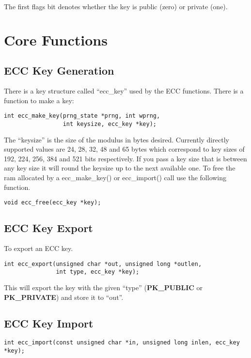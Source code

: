 \documentclass[a4paper]{book}
\begin{document}
The first flags bit denotes whether the key is public (zero) or private (one).  

\section{Core Functions}

\subsection{ECC Key Generation}
There is a key structure called ``ecc\_key'' used by the ECC functions.  There is a function to make a key:
\begin{verbatim}
int ecc_make_key(prng_state *prng, int wprng, 
                 int keysize, ecc_key *key);
\end{verbatim}

The ``keysize'' is the size of the modulus in bytes desired.  Currently directly supported values are 24, 28, 32, 48 and 65 bytes which
correspond to key sizes of 192, 224, 256, 384 and 521 bits respectively.  If you pass a key size that is between any key size it will round 
the keysize up to the next available one.   To free the ram allocated by a ecc\_make\_key() or ecc\_import() call use the following function.

\begin{verbatim}
void ecc_free(ecc_key *key);
\end{verbatim}

\subsection{ECC Key Export}
To export an ECC key.
\begin{verbatim}
int ecc_export(unsigned char *out, unsigned long *outlen, 
               int type, ecc_key *key);
\end{verbatim}
This will export the key with the given ``type'' (\textbf{PK\_PUBLIC} or \textbf{PK\_PRIVATE}) and store it to ``out''.  

\subsection{ECC Key Import}
\begin{verbatim}
int ecc_import(const unsigned char *in, unsigned long inlen, ecc_key *key);
\end{verbatim}
\end{document}
